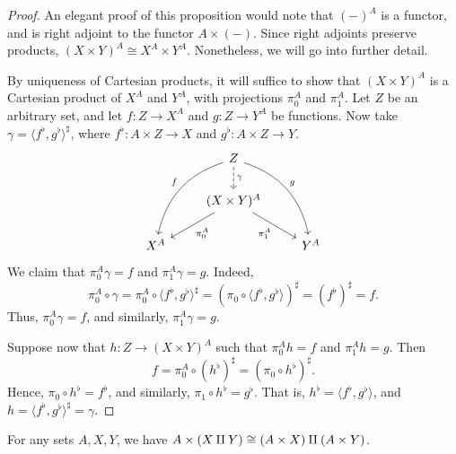 \begin{proof} An elegant proof of this proposition would note that
  $(-)^A$ is a functor, and is right adjoint to the functor $A\times
  (-)$.  Since right adjoints preserve products, $(X\times Y)^A\cong
  X^A\times Y^A$.  Nonetheless, we will go into further detail.

  By uniqueness of Cartesian products, it will suffice to show that
  $(X\times Y)^A$ is a Cartesian product of $X^A$ and $Y^A$, with
  projections $\pi _0^A$ and $\pi _1^A$.  Let $Z$ be an arbitrary set,
  and let $f:Z\to X^A$ and $g:Z\to Y^A$ be functions.  Now take
  $\gamma = \langle f^\flat ,g^\flat \rangle ^\sharp$, where
  $f^\flat:A\times Z\to X$ and $g^\flat:A\times Z\to Y$.
  \[ \begin{tikzcd} & Z \arrow[bend right,ddl,"f"'] \arrow[bend
    left,ddr,"g"]
    \arrow[dashed,d,"\gamma"] \\
    & (X\times Y)^A \arrow[dl,"\pi _0^A"] \arrow[dr,"\pi _1^A"'] \\
    X^A & & Y^A \end{tikzcd} \] We claim that $\pi _0^A\gamma =f$ and
  $\pi _1^A\gamma = g$.  Indeed,
  \[ \pi _0^A\circ \gamma = \pi _0^A \circ \langle f^\flat ,g^\flat
  \rangle ^\sharp = (\pi _0\circ \langle f^\flat ,g^\flat \rangle
  )^\sharp = (f^\flat )^\sharp = f .\] Thus, $\pi _0^A\gamma =f$, and
  similarly, $\pi _1^A\gamma =g$.

Suppose now that $h:Z\to (X\times Y)^A$ such that $\pi _0^Ah=f$ and
$\pi _1^Ah=g$.  Then 
\[ f = \pi _0^A\circ (h^\flat )^\sharp = (\pi _0\circ h^\flat )^\sharp
.\] Hence, $\pi _0\circ h^\flat=f^\flat$, and similarly, $\pi _1\circ
h^\flat=g^\flat$.  That is, $h^\flat = \langle f^\flat
,g^\flat\rangle$, and $h=\langle f^\flat ,g^\flat \rangle^\sharp
=\gamma$.
\end{proof}


\begin{prop} For any sets $A,X,Y$, we have $A\times (X\amalg Y)\cong
  (A\times X)\amalg (A\times Y)$. \end{prop}

